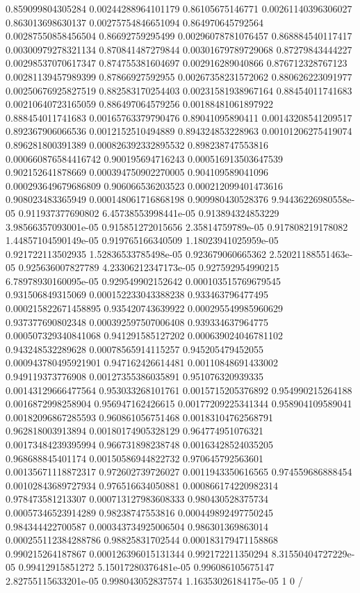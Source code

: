 \begin{table}
\begin{tabu}
\begin{sparkline}{10}
0.859099804305284 0.00244288964101179 0.86105675146771 0.00261140396306027 0.863013698630137 0.00275754846651094 0.864970645792564 0.00287550858456504 0.86692759295499 0.00296078781076457 0.868884540117417 0.00300979278321134 0.870841487279844 0.00301679789729068 0.87279843444227 0.00298537070617347 0.874755381604697 0.002916289040866 0.876712328767123 0.00281139457989399 0.87866927592955 0.00267358231572062 0.880626223091977 0.00250676925827519 0.882583170254403 0.00231581938967164 0.88454011741683 0.00210640723165059 0.886497064579256 0.00188481061897922 0.888454011741683 0.00165763379790476 0.89041095890411 0.00143208541209517 0.892367906066536 0.0012152510494889 0.894324853228963 0.00101206275419074 0.896281800391389 0.000826392332895532 0.898238747553816 0.000660876584416742 0.900195694716243 0.000516913503647539 0.902152641878669 0.000394750902270005 0.904109589041096 0.000293649679686809 0.906066536203523 0.000212099401473616 0.908023483365949 0.000148061716868198 0.909980430528376 9.94436226980558e-05 0.911937377690802 6.45738553998441e-05 0.913894324853229 3.98566357093001e-05 0.915851272015656 2.35814759789e-05 0.917808219178082 1.44857104590149e-05 0.919765166340509 1.18023941025959e-05 0.921722113502935 1.52836533785498e-05 0.923679060665362 2.52021188551463e-05 0.925636007827789 4.23306212347173e-05 0.927592954990215 6.78978930160095e-05 0.929549902152642 0.000103515769679545 0.931506849315069 0.000152233043388238 0.933463796477495 0.000215822671458895 0.935420743639922 0.000295549985960629 0.937377690802348 0.000392597507006408 0.939334637964775 0.000507329340841068 0.941291585127202 0.000639024046781102 0.943248532289628 0.00078565914115257 0.945205479452055 0.000943780495921901 0.947162426614481 0.00110848691433002 0.949119373776908 0.00127355386035891 0.951076320939335 0.00143129666477564 0.953033268101761 0.0015715205376892 0.954990215264188 0.0016872998258904 0.956947162426615 0.00177209225341344 0.958904109589041 0.00182096867285593 0.960861056751468 0.00183104762568791 0.962818003913894 0.00180174905328129 0.964774951076321 0.00173484239395994 0.966731898238748 0.00163428524035205 0.968688845401174 0.00150586944822732 0.970645792563601 0.00135671118872317 0.972602739726027 0.0011943350616565 0.974559686888454 0.00102843689727934 0.976516634050881 0.000866174220982314 0.978473581213307 0.000713127983608333 0.980430528375734 0.00057346523914289 0.98238747553816 0.000449892497750245 0.984344422700587 0.000343734925006504 0.986301369863014 0.000255112384288786 0.98825831702544 0.000183179471158868 0.990215264187867 0.000126396015131344 0.992172211350294 8.31550404727229e-05 0.99412915851272 5.15017280376481e-05 0.996086105675147 2.82755115633201e-05 0.998043052837574 1.16353026184175e-05 1 0 /

\end{sparkline}
\end{tabu}
\end{table}
